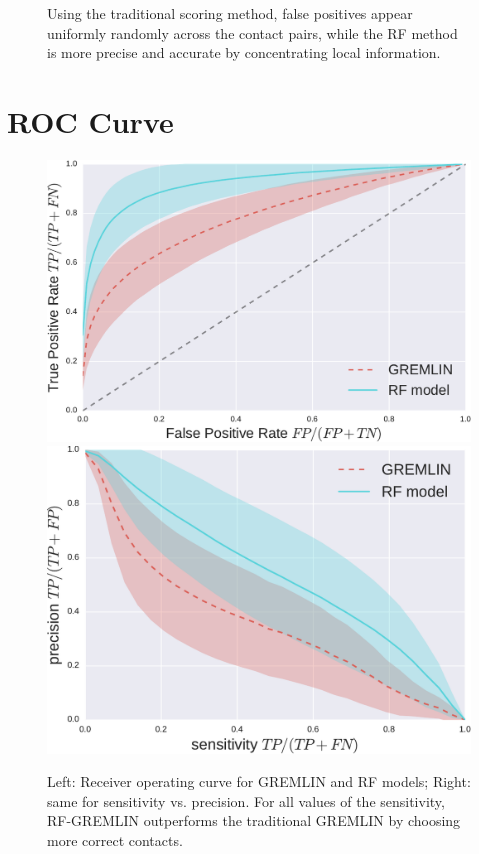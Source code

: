 \documentclass[landscape]{sciposter}
\newlength{\customfigheight}
\begin{document}
\begin{multicols}{3}
\begin{figure}
{Using the traditional scoring method, false positives appear uniformly randomly across the contact pairs, while the RF method is more precise and accurate by concentrating local information. }
\end{figure}

\vfill \columnbreak

\section*{ROC Curve}
\begin{figure}
    \center 
    \includegraphics[height=\customfigheight]{figures/GREMLIN_RF_ROC-crop.pdf}%
    \hfill%
    \includegraphics[height=\customfigheight]{figures/GREMLIN_RF_Acc_Pre-crop.pdf}%
\caption{%
Left: Receiver operating curve for GREMLIN and RF models; Right: same for sensitivity vs. precision. 
For all values of the sensitivity, RF-GREMLIN outperforms the traditional GREMLIN by choosing more correct contacts.
}

\end{figure}

\end{multicols}
\end{document}
